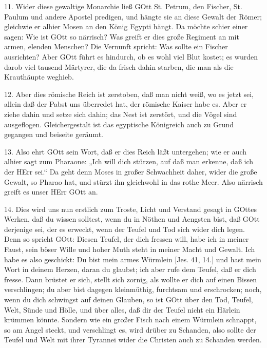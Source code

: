 11. Wider diese gewaltige Monarchie ließ GOtt St. Petrum, den Fischer, St. Paulum und andere Apostel predigen, und hängte sie an diese Gewalt der Römer; gleichwie er alhier Mosen an den König Egypti hängt. Da möchte schier einer sagen: Wie ist GOtt so närrisch? Was greift er dies große Regiment an mit armen, elenden Menschen? Die Vernunft spricht: Was sollte ein Fischer ausrichten? Aber GOtt führt es hindurch, ob es wohl viel Blut kostet; es wurden darob viel tausend Märtyrer, die da frisch dahin starben, die man als die Krauthäupte weghieb.

12. Aber dies römische Reich ist zerstoben, daß man nicht weiß, wo es jetzt sei, allein daß der Pabst uns überredet hat, der römische Kaiser habe es. Aber er ziehe dahin und setze sich dahin; das Nest ist zerstört, und die Vögel sind ausgeflogen. Gleichergestalt ist das egyptische Königreich auch zu Grund gegangen und beiseite geräumt.

13. Also ehrt GOtt sein Wort, daß er dies Reich läßt untergehen; wie er auch alhier sagt zum Pharaone: „Ich will dich stürzen, auf daß man erkenne, daß ich der HErr sei.“ Da geht denn Moses in großer Schwachheit daher, wider die große Gewalt, so Pharao hat, und stürzt ihn gleichwohl in das rothe Meer. Also närrisch greift es unser HErr GOtt an.

14. Dies wird uns nun erstlich zum Troste, Licht und Verstand gesagt in GOttes Werken, daß du wissen solltest, wenn du in Nöthen und Aengsten bist, daß GOtt derjenige sei, der es erweckt, wenn der Teufel und Tod sich wider dich legen. Denn so spricht GOtt: Diesen Teufel, der dich fressen will, habe ich in meiner Faust, sein böser Wille und hoher Muth steht in meiner Macht und Gewalt. Ich habe es also geschickt: Du bist mein armes Würmlein [Jes. 41, 14.] und hast mein Wort in deinem Herzen, daran du glaubst; ich aber rufe dem Teufel, daß er dich fresse. Dann brüstet er sich, stellt sich zornig, als wollte er dich auf einen Bissen verschlingen; du aber bist dagegen kleinmüthig, furchtsam und erschrocken; noch, wenn du dich schwingst auf deinen Glauben, so ist GOtt über den Tod, Teufel, Welt, Sünde und Hölle, und über alles, daß dir der Teufel nicht ein Härlein krümmen könnte. Sondern wie ein großer Fisch nach einem Würmlein schnappt, so am Angel steckt, und verschlingt es, wird drüber zu Schanden, also sollte der Teufel und Welt mit ihrer Tyrannei wider die Christen auch zu Schanden werden.

